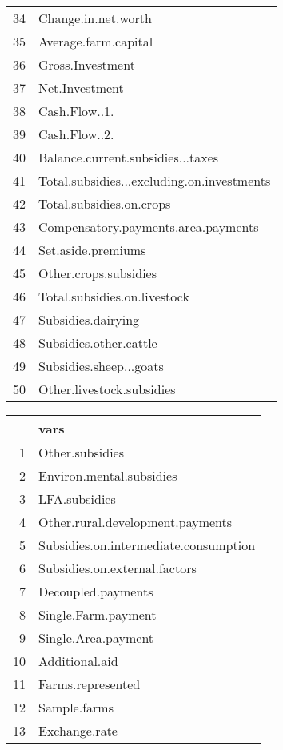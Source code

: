 \documentclass{article}\usepackage{graphicx, color}
\begin{document}
\begin{flushleft}
\begin{table}[ht]
\begin{center}
\begin{tabular}{rl}
  34 & Change.in.net.worth \\ 
  35 & Average.farm.capital \\ 
  36 & Gross.Investment \\ 
  37 & Net.Investment \\ 
  38 & Cash.Flow..1. \\ 
  39 & Cash.Flow..2. \\ 
  40 & Balance.current.subsidies...taxes \\ 
  41 & Total.subsidies...excluding.on.investments \\ 
  42 & Total.subsidies.on.crops \\ 
  43 & Compensatory.payments.area.payments \\ 
  44 & Set.aside.premiums \\ 
  45 & Other.crops.subsidies \\ 
  46 & Total.subsidies.on.livestock \\ 
  47 & Subsidies.dairying \\ 
  48 & Subsidies.other.cattle \\ 
  49 & Subsidies.sheep...goats \\ 
  50 & Other.livestock.subsidies \\ 
   \hline
\end{tabular}
\end{center}
\end{table}


\newpage
\begin{table}[ht]
\begin{center}
\begin{tabular}{rl}
  \hline
 & vars \\ 
  \hline
1 & Other.subsidies \\ 
  2 & Environ.mental.subsidies \\ 
  3 & LFA.subsidies \\ 
  4 & Other.rural.development.payments \\ 
  5 & Subsidies.on.intermediate.consumption \\ 
  6 & Subsidies.on.external.factors \\ 
  7 & Decoupled.payments \\ 
  8 & Single.Farm.payment \\ 
  9 & Single.Area.payment \\ 
  10 & Additional.aid \\ 
  11 & Farms.represented \\ 
  12 & Sample.farms \\ 
  13 & Exchange.rate \\ 
   \hline
\end{tabular}
\end{center}
\end{table}



\end{flushleft}
\end{document}
